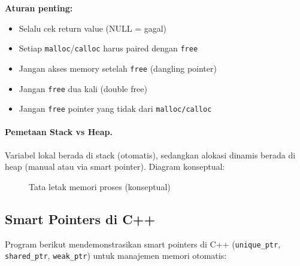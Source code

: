 \documentclass[../main.tex]{subfiles}
\begin{document}
\textbf{Aturan penting:}
\begin{itemize}
  \item Selalu cek return value (NULL = gagal)
  \item Setiap \texttt{malloc}/\texttt{calloc} harus paired dengan \texttt{free}
  \item Jangan akses memory setelah \texttt{free} (dangling pointer)
  \item Jangan \texttt{free} dua kali (double free)
  \item Jangan \texttt{free} pointer yang tidak dari \texttt{malloc/calloc}
\end{itemize}

\paragraph{Pemetaan Stack vs Heap.} Variabel lokal berada di stack (otomatis), sedangkan alokasi dinamis berada di heap (manual atau via smart pointer). Diagram konseptual:
\begin{figure}[H]
  \centering
  \caption{Tata letak memori proses (konseptual)}
\end{figure}

\subsection{Smart Pointers di C++}

Program berikut mendemonstrasikan smart pointers di C++ (\texttt{unique\_ptr}, \texttt{shared\_ptr}, \texttt{weak\_ptr}) untuk manajemen memori otomatis:
\end{document}
